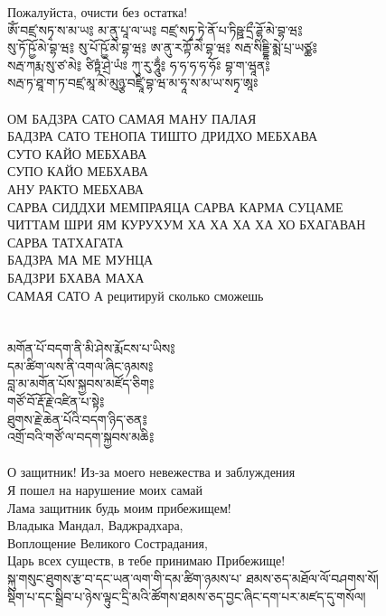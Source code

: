 Пожалуйста, очисти без остатка!\\
\ru
\newpage
\ti
ཨོཾ་བཛྲ་སཏྭ་ས་མ་ཡ༔ མ་ནུ་པཱ་ལ་ཡ༔ བཛྲ་སཏྭ་ཏྭེ་ནོ་པ་ཏིཥྛ་དྲྀ་ཌྷོ་མེ་བྷ་ཝ༔ \\
སུ་ཏོ་ཥྱོ་མེ་བྷ་ཝ༔ སུ་པོ་ཥྱོ་མེ་བྷ་ཝ༔ ཨ་ནུ་རཀྟོ་མེ་བྷ་ཝ༔ སརྦ་སིདྡྷི་མྨེ་པྲ་ཡཙྪ༔ \\
སརྦ་ཀརྨ་སུ་ཙ་མེ༔ ཙིཏྟཾ་ཤྲེ་ཡཾཿ ཀུ་རུ་ཧཱུྂ༔ ཧ་ཧ་ཧ་ཧ་ཧོཿ བྷ་ག་ཝཱན༔ \\
སརྦ་ཏ་ཐཱ་ག་ཏ་བཛྲ་མཱ་མེ་མུཉྩ་བཛྲཱི་བྷ་ཝ་མ་ཧཱ་ས་མ་ཡ་སཏྭ་ཨཱཿ\\
\\
\ru
ОМ БАДЗРА САТО САМАЯ МАНУ ПАЛАЯ\\
БАДЗРА САТО ТЕНОПА ТИШТО ДРИДХО МЕБХАВА\\
СУТО КАЙО МЕБХАВА\\
СУПО КАЙО МЕБХАВА\\
АНУ РАКТО МЕБХАВА\\
САРВА СИДДХИ МЕМПРАЯЦА САРВА КАРМА СУЦАМЕ\\
ЧИТТАМ ШРИ ЯМ КУРУХУМ ХА ХА ХА ХА ХО БХАГАВАН\\
САРВА ТАТХАГАТА\\
БАДЗРА МА МЕ МУНЦА\\
БАДЗРИ БХАВА МАХА\\
САМАЯ САТО А \hspace{2cm} рецитируй сколько сможешь\\
\\
\\
\ti
མགོན་པོ་བདག་ནི་མི་ཤེས་རྨོངས་པ་ཡིས༔\\
དམ་ཚིག་ལས་ནི་འགལ་ཞིང་ཉམས༔ \\
བླ་མ་མགོན་པོས་སྐྱབས་མཛོད་ཅིག༔ \\
གཙོ་བོ་རྡོ་རྗེ་འཛིན་པ་སྟེ༔ \\
ཐུགས་རྗེ་ཆེན་པོའི་བདག་ཉིད་ཅན༔ \\
འགྲོ་བའི་གཙོ་ལ་བདག་སྐྱབས་མཆི༔\\
\\
\ru
О защитник! Из-за моего невежества и заблуждения\\
 Я пошел на нарушение моих самай\\
Лама защитник будь моим прибежищем!\\
Владыка Мандал, Ваджрадхара,\\
Воплощение Великого Сострадания,\\
Царь всех существ, в тебе принимаю Прибежище!\\
\newpage
\ti
སྐུ་གསུང་ཐུགས་རྩ་བ་དང་ཡན་ལག་གི་དམ་ཚིག་ཉམས་པ་ ཐམས་ཅད་མཐོལ་ལོ་བཤགས་སོ། \\
སྡིག་པ་དང་སྒྲིབ་པ་ཉེས་ལྟུང་དྲི་མའི་ཚོགས་ཐམས་ཅད་བྱང་ཞིང་དག་པར་མཛད་དུ་གསོལ། \\
